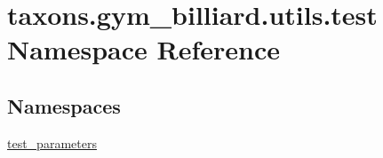 \hypertarget{namespacetaxons_1_1gym__billiard_1_1utils_1_1test}{}\section{taxons.\+gym\+\_\+billiard.\+utils.\+test Namespace Reference}
\label{namespacetaxons_1_1gym__billiard_1_1utils_1_1test}
\subsection*{Namespaces}
\begin{DoxyCompactItemize}
\item 
 \hyperlink{namespacetaxons_1_1gym__billiard_1_1utils_1_1test_1_1test__parameters}{test\+\_\+parameters}
\end{DoxyCompactItemize}

